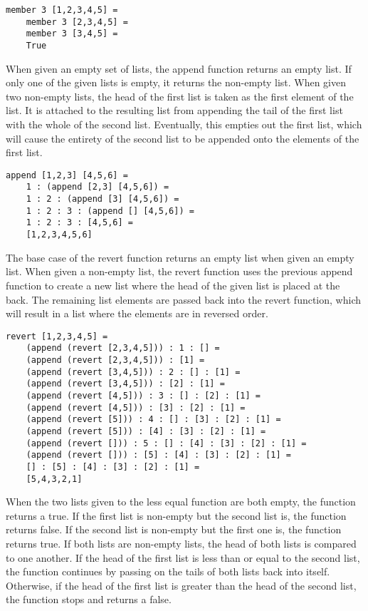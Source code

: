 \documentclass{article}
\theoremstyle{theorem}
\theoremstyle{definition}
\theoremstyle{remark}
\begin{document}
\begin{lstlisting}
member 3 [1,2,3,4,5] =
	member 3 [2,3,4,5] =
	member 3 [3,4,5] =
	True
\end{lstlisting}
%
When given an empty set of lists, the append function returns an empty list. If only one of the given lists is empty, it returns the non-empty list. When given two non-empty lists, the head of the first list is taken as the first element of the list. It is attached to the resulting list from appending the tail of the first list with the whole of the second list. Eventually, this empties out the first list, which will cause the entirety of the second list to be appended onto the elements of the first list.

\begin{lstlisting}
append [1,2,3] [4,5,6] =
	1 : (append [2,3] [4,5,6]) =
	1 : 2 : (append [3] [4,5,6]) =
	1 : 2 : 3 : (append [] [4,5,6]) =
	1 : 2 : 3 : [4,5,6] =
	[1,2,3,4,5,6]
\end{lstlisting}
%
The base case of the revert function returns an empty list when given an empty list. When given a non-empty list, the revert function uses the previous append function to create a new list where the head of the given list is placed at the back. The remaining list elements are passed back into the revert function, which will result in a list where the elements are in reversed order.

\begin{lstlisting}
revert [1,2,3,4,5] =
	(append (revert [2,3,4,5])) : 1 : [] =
	(append (revert [2,3,4,5])) : [1] =
	(append (revert [3,4,5])) : 2 : [] : [1] =
	(append (revert [3,4,5])) : [2] : [1] =
	(append (revert [4,5])) : 3 : [] : [2] : [1] =
	(append (revert [4,5])) : [3] : [2] : [1] =
	(append (revert [5])) : 4 : [] : [3] : [2] : [1] =
	(append (revert [5])) : [4] : [3] : [2] : [1] =
	(append (revert [])) : 5 : [] : [4] : [3] : [2] : [1] =
	(append (revert [])) : [5] : [4] : [3] : [2] : [1] =
	[] : [5] : [4] : [3] : [2] : [1] =
	[5,4,3,2,1]
\end{lstlisting}
%
When the two lists given to the less equal function are both empty, the function returns a true. If the first list is non-empty but the second list is, the function returns false. If the second list is non-empty but the first one is, the function returns true. If both lists are non-empty lists, the head of both lists is compared to one another. If the head of the first list is less than or equal to the second list, the function continues by passing on the tails of both lists back into itself. Otherwise, if the head of the first list is greater than the head of the second list, the function stops and returns a false.
\end{document}
